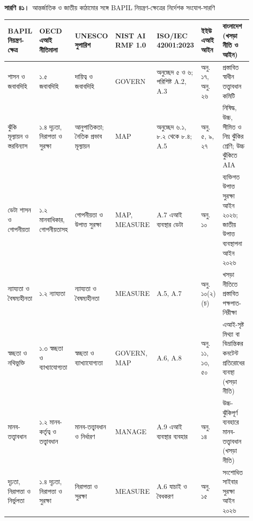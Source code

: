 \documentclass[border=10pt]{standalone}
\begin{document}
\begin{minipage}{22cm}
{\large\bfseries সারণি ৪১।}\ {\large আন্তর্জাতিক ও জাতীয় কাঠামোর সঙ্গে BAPIL নিয়ন্ত্রণ-ক্ষেত্রের নির্দেশক সংযোগ-সারণি}\par\vspace{7pt}
\small
{}
\begin{tabularx}{\linewidth}{@{}>{\hsize=1.102\hsize\raggedright\arraybackslash}X>{\hsize=0.907\hsize\raggedright\arraybackslash}X>{\hsize=1.037\hsize\raggedright\arraybackslash}X>{\hsize=0.778\hsize\raggedright\arraybackslash}X>{\hsize=1.037\hsize\raggedright\arraybackslash}X>{\hsize=0.972\hsize\raggedright\arraybackslash}X>{\hsize=1.167\hsize\raggedright\arraybackslash}X@{}}
\arrayrulecolor{bapilrule}\toprule
\rowcolor{white}\textbf{BAPIL নিয়ন্ত্রণ-ক্ষেত্র} & \textbf{OECD এআই নীতিমালা} & \textbf{UNESCO সুপারিশ} & \textbf{NIST AI RMF 1.0} & \textbf{ISO/\allowbreak{}IEC 42001:2023} & \textbf{ইইউ এআই আইন} & \textbf{বাংলাদেশ (খসড়া নীতি ও আইন)} \\
\midrule
শাসন ও জবাবদিহি & ১.৫ জবাবদিহি & দায়িত্ব ও জবাবদিহি & GOVERN & অনুচ্ছেদ ৫ ও ৬; পরিশিষ্ট A.2, A.3 & অনু. ১৭, অনু. ২৬ & প্রস্তাবিত স্বাধীন তত্ত্বাবধান কমিটি \\
ঝুঁকি মূল্যায়ন ও স্তরবিন্যাস & ১.৪ দৃঢ়তা, নিরাপত্তা ও সুরক্ষা & আনুপাতিকতা; নৈতিক প্রভাব মূল্যায়ন & MAP & অনুচ্ছেদ ৬.১, ৮.২ থেকে ৮.৪; A.5 & অনু. ৫, ৯, ২৭ & নিষিদ্ধ, উচ্চ, সীমিত ও নিম্ন ঝুঁকির শ্রেণি; উচ্চ ঝুঁকিতে AIA \\
ডেটা শাসন ও গোপনীয়তা & ১.২ মানবাধিকার, গোপনীয়তাসহ & গোপনীয়তা ও উপাত্ত সুরক্ষা & MAP, MEASURE & A.7 এআই ব্যবস্থার ডেটা & অনু. ১০ & ব্যক্তিগত উপাত্ত সুরক্ষা আইন ২০২৬; জাতীয় উপাত্ত ব্যবস্থাপনা আইন ২০২৬ \\
ন্যায্যতা ও বৈষম্যহীনতা & ১.২ ন্যায্যতা & ন্যায্যতা ও বৈষম্যহীনতা & MEASURE & A.5, A.7 & অনু. ১০(২)(চ) & খসড়া নীতিতে প্রস্তাবিত পক্ষপাত-নিরীক্ষা \\
স্বচ্ছতা ও নথিভুক্তি & ১.৩ স্বচ্ছতা ও ব্যাখ্যাযোগ্যতা & স্বচ্ছতা ও ব্যাখ্যাযোগ্যতা & GOVERN, MAP & A.6, A.8 & অনু. ১১, ১৩, ৫০ & এআই-সৃষ্ট মিথ্যা বা বিভ্রান্তিকর কনটেন্ট প্রতিরোধের ব্যবস্থা (খসড়া নীতি) \\
মানব-তত্ত্বাবধান & ১.২ মানব-কর্তৃত্ব ও তত্ত্বাবধান & মানব-তত্ত্বাবধান ও নির্ধারণ & MANAGE & A.9 এআই ব্যবস্থার ব্যবহার & অনু. ১৪ & উচ্চ-ঝুঁকিপূর্ণ ব্যবহারে মানব-তত্ত্বাবধান (খসড়া নীতি) \\
দৃঢ়তা, নিরাপত্তা ও নির্ভুলতা & ১.৪ দৃঢ়তা, নিরাপত্তা ও সুরক্ষা & নিরাপত্তা ও সুরক্ষা & MEASURE & A.6 যাচাই ও বৈধকরণ & অনু. ১৫ & সংশোধিত সাইবার সুরক্ষা আইন ২০২৬ \\

\end{tabularx}
\end{minipage}
\end{document}
